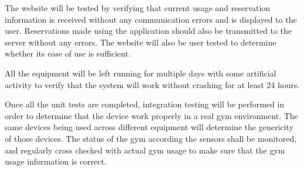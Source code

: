 \documentclass[PPFS.tex]{template/subfiles}
\begin{document}
The website will be tested by verifying that current usage and reservation information is received without any communication errors and is displayed to the user. Reservations made using the application should also be transmitted to the server without any errors. The website will also be user tested to determine whether its ease of use is sufficient.

All the equipment will be left running for multiple days with some artificial activity to verify that the system will work without crashing for at least 24 hours.

Once all the unit tests are completed, integration testing will be performed in order to determine that the device work properly in a real gym environment. The same devices being used across different equipment will determine the genericity of those devices. The status of the gym according the sensors shall be monitored, and regularly cross checked with actual gym usage to make sure that the gym usage information is correct. 
\end{document}
